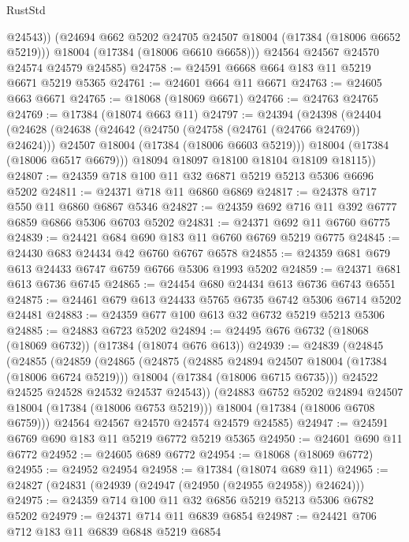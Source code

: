 \begin{lexlean}{RustStd}
\begin{coremodule}
            @24543))
        (@24694 @662 @5202 @24705 @24507 @18004 (@17384 (@18006 @6652 @5219)))
        @18004
        (@17384 (@18006 @6610 @6658)))
      @24564
      @24567
      @24570
      @24574
      @24579
      @24585)
@24758 := @24591 @6668 @664 @183 @11 @5219 @6671 @5219 @5365
@24761 := @24601 @664 @11 @6671
@24763 := @24605 @663 @6671
@24765 := @18068 (@18069 @6671)
@24766 := @24763 @24765
@24769 := @17384 (@18074 @663 @11)
@24797 := @24394
    (@24398
      (@24404
        (@24628
          (@24638
            (@24642 (@24750 (@24758 (@24761 (@24766 @24769)) @24624)))
            @24507
            @18004
            (@17384 (@18006 @6603 @5219)))
          @18004
          (@17384 (@18006 @6517 @6679)))
        @18094
        @18097
        @18100
        @18104
        @18109
        @18115))
@24807 := @24359 @718 @100 @11 @32 @6871 @5219 @5213 @5306 @6696 @5202
@24811 := @24371 @718 @11 @6860 @6869
@24817 := @24378 @717 @550 @11 @6860 @6867 @5346
@24827 := @24359 @692 @716 @11 @392 @6777 @6859 @6866 @5306 @6703 @5202
@24831 := @24371 @692 @11 @6760 @6775
@24839 := @24421 @684 @690 @183 @11 @6760 @6769 @5219 @6775
@24845 := @24430 @683 @24434 @42 @6760 @6767 @6578
@24855 := @24359 @681 @679 @613 @24433 @6747 @6759 @6766 @5306 @1993 @5202
@24859 := @24371 @681 @613 @6736 @6745
@24865 := @24454 @680 @24434 @613 @6736 @6743 @6551
@24875 := @24461 @679 @613 @24433 @5765 @6735 @6742 @5306 @6714 @5202 @24481
@24883 := @24359 @677 @100 @613 @32 @6732 @5219 @5213 @5306
@24885 := @24883 @6723 @5202
@24894 := @24495 @676 @6732 (@18068 (@18069 @6732)) (@17384 (@18074 @676 @613))
@24939 := @24839
    (@24845
      (@24855
        (@24859
          (@24865
            (@24875
              (@24885 @24894 @24507 @18004 (@17384 (@18006 @6724 @5219)))
              @18004
              (@17384 (@18006 @6715 @6735)))
            @24522
            @24525
            @24528
            @24532
            @24537
            @24543))
        (@24883 @6752 @5202 @24894 @24507 @18004 (@17384 (@18006 @6753 @5219)))
        @18004
        (@17384 (@18006 @6708 @6759)))
      @24564
      @24567
      @24570
      @24574
      @24579
      @24585)
@24947 := @24591 @6769 @690 @183 @11 @5219 @6772 @5219 @5365
@24950 := @24601 @690 @11 @6772
@24952 := @24605 @689 @6772
@24954 := @18068 (@18069 @6772)
@24955 := @24952 @24954
@24958 := @17384 (@18074 @689 @11)
@24965 := @24827 (@24831 (@24939 (@24947 (@24950 (@24955 @24958)) @24624)))
@24975 := @24359 @714 @100 @11 @32 @6856 @5219 @5213 @5306 @6782 @5202
@24979 := @24371 @714 @11 @6839 @6854
@24987 := @24421 @706 @712 @183 @11 @6839 @6848 @5219 @6854

\end{coremodule}
\end{lexlean}
